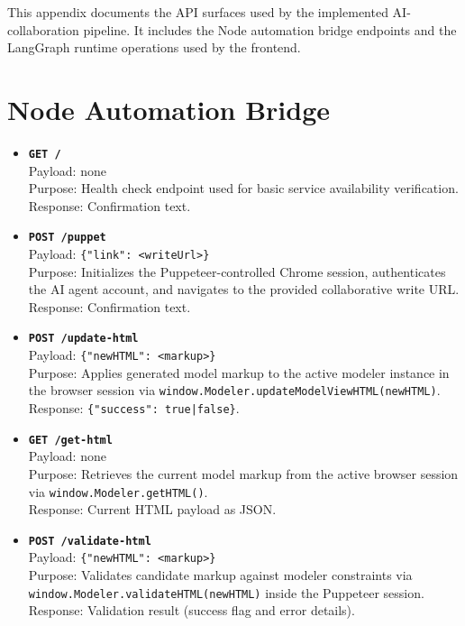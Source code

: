 This appendix documents the API surfaces used by the implemented AI-collaboration pipeline. It includes the Node automation bridge endpoints and the LangGraph runtime operations used by the frontend.

\section{Node Automation Bridge}
\label{sec:appendix-api-node-bridge}

\begin{itemize}
    \item \textbf{\texttt{GET /}} \\
    Payload: none \\
    Purpose: Health check endpoint used for basic service availability verification. \\
    Response: Confirmation text.

    \item \textbf{\texttt{POST /puppet}} \\
    Payload: \texttt{\{"link": <writeUrl>\}} \\
    Purpose: Initializes the Puppeteer-controlled Chrome session, authenticates the AI agent account, and navigates to the provided collaborative write URL. \\
    Response: Confirmation text.

    \item \textbf{\texttt{POST /update-html}} \\
    Payload: \texttt{\{"newHTML": <markup>\}} \\
    Purpose: Applies generated model markup to the active modeler instance in the browser session via \texttt{window.Modeler.updateModelViewHTML(newHTML)}. \\
    Response: \texttt{\{"success": true|false\}}.

    \item \textbf{\texttt{GET /get-html}} \\
    Payload: none \\
    Purpose: Retrieves the current model markup from the active browser session via \texttt{window.Modeler.getHTML()}. \\
    Response: Current HTML payload as JSON.

    \item \textbf{\texttt{POST /validate-html}} \\
    Payload: \texttt{\{"newHTML": <markup>\}} \\
    Purpose: Validates candidate markup against modeler constraints via \\ 
    \texttt{window.Modeler.validateHTML(newHTML)} inside the Puppeteer session. \\
    Response: Validation result (success flag and error details).
\end{itemize}

